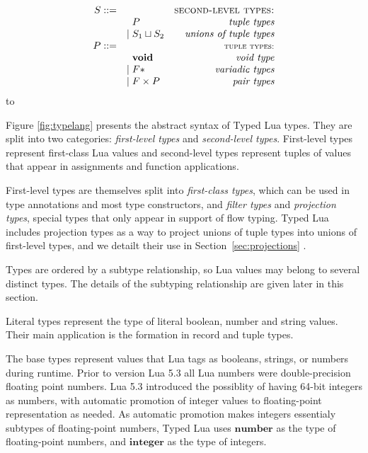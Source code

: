 \documentclass{sigplanconf}
\newcommand{\Integer}{\mathbf{integer}}
\newcommand{\Number}{\mathbf{number}}
\newcommand{\Void}{\mathbf{void}}
\def\dend{\hbox to \hsize{\vrule height 4pt\hrulefill\vrule height 4pt}}
\begin{document}
\begin{figure*}[!ht]
$$\begin{array}{rlr}
S ::= & & \textsc{second-level types:}\\
& \;\; P & \textit{tuple types}\\
& | \; S_{1} \sqcup S_{2} & \textit{unions of tuple types}\\
P ::= & & \textsc{{\small tuple types:}}\\
& \;\; \Void & \textit{void type}\\
& | \; F{*} & \textit{variadic types}\\
& | \; F \times P & \textit{pair types}
\end{array}
$$
\dend
\caption{The abstract syntax of Typed Lua types}
\label{fig:typelang}
\end{figure*}

Figure \ref{fig:typelang} presents the abstract syntax of
Typed Lua types. They are split into two categories:
\emph{first-level types} and \emph{second-level types}.
First-level types represent first-class Lua values and
second-level types represent tuples of values that appear in 
assignments and function applications. 

First-level types are
themselves split into {\em first-class types}, which can be
used in type annotations and most type constructors, and
{\em filter types} and {\em projection types}, special
types that only appear in support of flow typing.
Typed Lua includes projection types as a way to project
unions of tuple types into unions of first-level types,
and we detailt their use in Section~\ref{sec:projections} .

Types are ordered by a subtype relationship, so Lua values may belong to several distinct types. The details of the subtyping
relationship are given later in this section.

Literal types represent the type of literal boolean, number
and string values. Their main application is the formation in record and tuple types.

The base types represent values that Lua tags as booleans,
strings, or numbers during runtime. Prior to version Lua 5.3 all Lua numbers were double-precision floating point numbers.
Lua 5.3 introduced the possiblity of having 64-bit integers
as numbers, with automatic promotion of integer values to
floating-point representation as needed. As automatic
promotion makes integers essentialy subtypes of floating-point numbers, Typed Lua uses $\Number$ as the type of floating-point numbers, and $\Integer$ as the type of integers.
\end{document}
